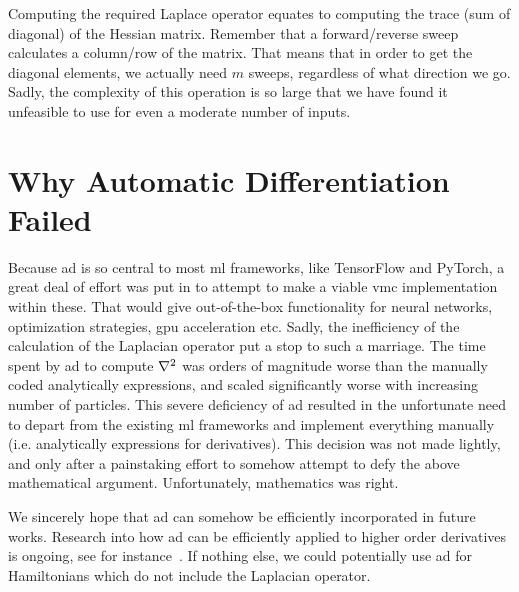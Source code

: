 \documentclass[Thesis.tex]{subfiles}
\begin{document}
Computing the required Laplace operator equates to computing the trace (sum of
diagonal) of the Hessian matrix. Remember that a forward/reverse sweep
calculates a column/row of the matrix. That means that in order to get the
diagonal elements, we actually need $m$ sweeps, regardless of what direction we
go. Sadly, the complexity of this operation is so large that we have found it
unfeasible to use for even a moderate number of inputs.


\section{Why Automatic Differentiation Failed}

Because \gls{ad} is so central to most \gls{ml} frameworks, like TensorFlow and
PyTorch, a great deal of effort was put in to attempt to make a viable \gls{vmc}
implementation within these. That would give out-of-the-box functionality for
neural networks, optimization strategies, \acrshort{gpu} acceleration etc.
Sadly, the inefficiency of the calculation of the Laplacian operator put a stop
to such a marriage. The time spent by \gls{ad} to compute $\laplacian$ was
orders of magnitude worse than the manually coded analytically expressions, and
scaled significantly worse with increasing number of particles. This severe
deficiency of \gls{ad} resulted in the unfortunate need to depart from the
existing \gls{ml} frameworks and implement everything manually (i.e.
analytically expressions for derivatives). This decision was not made lightly,
and only after a painstaking effort to somehow attempt to defy the above
mathematical argument. Unfortunately, mathematics was right.

We sincerely hope that \gls{ad} can somehow be efficiently incorporated in
future works. Research into how \gls{ad} can be efficiently applied to higher
order derivatives is ongoing, see for instance~\textcite{wang2017}. If nothing
else, we could potentially use \gls{ad} for Hamiltonians which do not include
the Laplacian operator.
\end{document}
